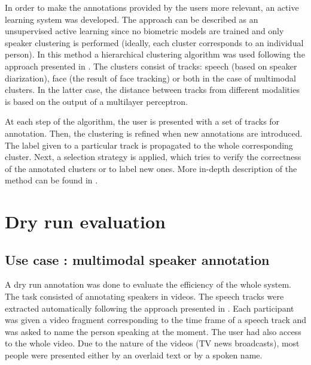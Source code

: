 \documentclass[a4paper]{article}
\begin{document}
In order to make the annotations provided by the users more relevant, an active learning system 
was developed. The approach can be described as an unsupervised active learning since no biometric models are trained and only speaker clustering is performed (ideally, each cluster corresponds to an individual person).  In this method a hierarchical clustering algorithm was used 
following the  approach presented in \cite{poignant2012unsupervised}.  The clusters consist of tracks: speech (based on speaker diarization),  face (the result of face tracking) or both in the case of multimodal clusters. In the latter case, the distance between tracks from different modalities is based on the output of a multilayer perceptron.

At each step of the algorithm, the user is presented with a set of tracks for annotation. Then, the clustering is refined when new annotations are introduced.
The label given to a particular track is propagated to the whole corresponding cluster. Next, a selection strategy is applied, which tries to verify the correctness of the annotated clusters or to label new ones.
More in-depth description of the method can be found in \cite{budnik2014automatic}.

%


  \section{Dry run evaluation}
      \subsection{Use case : multimodal speaker annotation}
     

A dry run annotation was done to evaluate the efficiency of the whole system. The task consisted of annotating speakers in videos. The speech tracks were extracted automatically following the approach presented in \cite{barras2006multistage}.
Each participant was given a video fragment corresponding to the time frame of a speech track and was asked to name the person speaking at the moment.
The user had also access to the whole video. Due to the nature of the videos (TV news broadcasts), most people were presented either by an overlaid text or by a spoken name.
 
\end{document}

